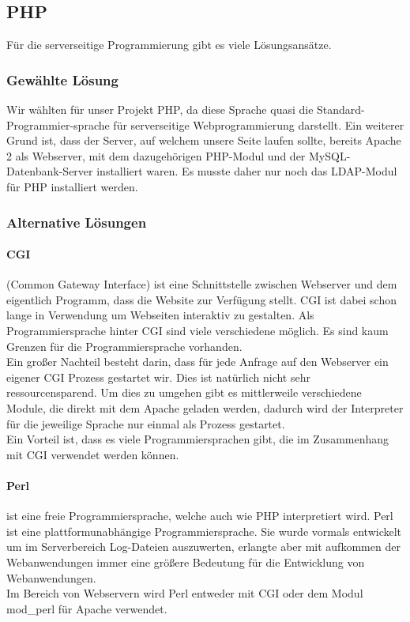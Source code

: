 \subsection{PHP}
Für die serverseitige Programmierung gibt es viele Lösungsansätze. 
\subsubsection{Gewählte Lösung}
Wir wählten für unser Projekt PHP, da diese Sprache quasi die Standard-Programmier-sprache für serverseitige Webprogrammierung darstellt. Ein weiterer Grund ist, dass der Server, auf welchem unsere Seite laufen sollte, bereits Apache 2 als Webserver, mit dem dazugehörigen PHP-Modul und der MySQL-Datenbank-Server installiert waren. Es musste daher nur noch das LDAP-Modul für PHP installiert werden.
\subsubsection{Alternative Lösungen}
\paragraph{CGI} (Common Gateway Interface) ist eine Schnittstelle zwischen Webserver und dem eigentlich Programm, dass die Website zur Verfügung stellt. CGI ist dabei schon lange in Verwendung um Webseiten interaktiv zu gestalten. Als Programmiersprache hinter CGI sind viele verschiedene möglich. Es sind kaum Grenzen für die Programmiersprache vorhanden.\\
Ein großer Nachteil besteht darin, dass für jede Anfrage auf den Webserver ein eigener CGI Prozess gestartet wir. Dies ist natürlich nicht sehr ressourcensparend. Um dies zu umgehen gibt es mittlerweile verschiedene Module, die direkt mit dem Apache geladen werden, dadurch wird der Interpreter für die jeweilige Sprache nur einmal als Prozess gestartet.\\
Ein Vorteil ist, dass es viele Programmiersprachen gibt, die im Zusammenhang mit CGI verwendet werden können. 
\paragraph{Perl}
 ist eine freie Programmiersprache, welche auch wie PHP interpretiert wird. Perl ist eine plattformunabhängige Programmiersprache. Sie wurde vormals entwickelt um im Serverbereich Log-Dateien auszuwerten, erlangte aber mit aufkommen der Webanwendungen immer eine größere Bedeutung für die Entwicklung von Webanwendungen.\\
Im Bereich von Webservern wird Perl entweder mit CGI oder dem Modul mod\_perl für Apache verwendet.\\
